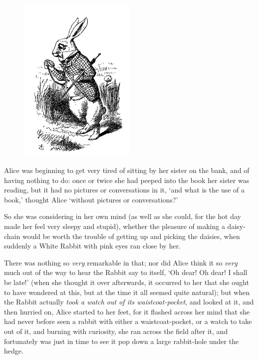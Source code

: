 \documentclass[12pt,openany]{memoir}
\begin{document}
\begin{figure}
  \includegraphics[width=0.5\textwidth]{illustrations/pic_02.jpg}
\end{figure}

Alice was beginning to get very tired of sitting by her sister on the bank, and of having nothing to do: once or twice she had peeped into the book her sister was reading, but it had no pictures or conversations in it, `and what is the use of a book,' thought Alice `without pictures or conversations?'

So she was considering in her own mind (as well as she could, for the hot day made her feel very sleepy and stupid), whether the pleasure of making a daisy-chain would be worth the trouble of getting up and picking the daisies, when suddenly a White Rabbit with pink eyes ran close by her.

There was nothing so \textit{very} remarkable in that; nor did Alice think it so \textit{very} much out of the way to hear the Rabbit say to itself, `Oh dear! Oh dear! I shall be late!' (when she thought it over afterwards, it occurred to her that she ought to have wondered at this, but at the time it all seemed quite natural); but when the Rabbit actually \textit{took a watch out of its waistcoat-pocket}, and looked at it, and then hurried on, Alice started to her feet, for it flashed across her mind that she had never before seen a rabbit with either a waistcoat-pocket, or a watch to take out of it, and burning with curiosity, she ran across the field after it, and fortunately was just in time to see it pop down a large rabbit-hole under the hedge.
\end{document}
